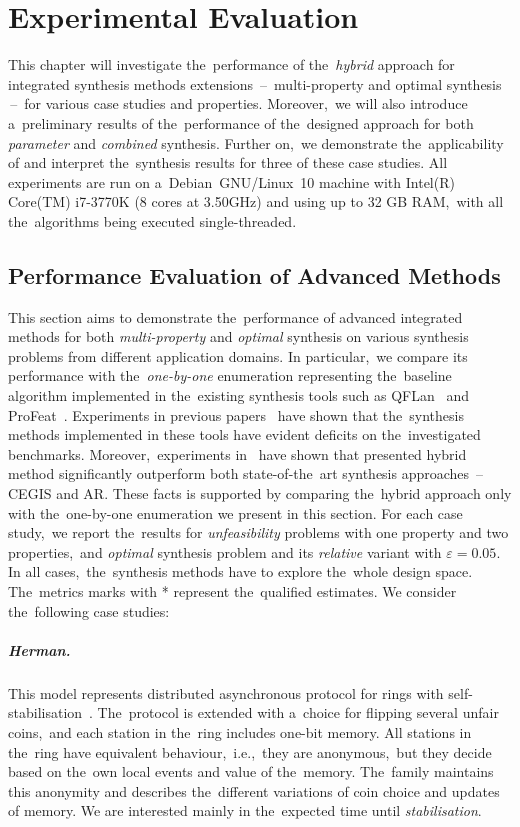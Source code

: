 \chapter{Experimental Evaluation}\label{chap:experiments}
This chapter will investigate the~performance of the~\emph{hybrid} approach for integrated synthesis methods extensions \,--\, multi-property and optimal synthesis \,--\, for various case studies and properties.
Moreover,~we will also introduce a~preliminary results of the~performance of the~designed approach for both \emph{parameter} and \emph{combined} synthesis.
Further on,~we demonstrate the~applicability of \toolname{} and interpret the~synthesis results for three of these case studies.
All experiments are run on a~Debian~GNU/Linux~10 machine with Intel(R) Core(TM) i7-3770K (8 cores at 3.50GHz) and using up to 32 GB RAM,~with all the~algorithms being executed single-threaded.

\section{Performance Evaluation of Advanced Methods}
This section aims to demonstrate the~performance of advanced integrated methods for both \textit{multi-property} and \textit{optimal} synthesis on various synthesis problems from different application domains.
In particular,~we compare its performance with the~\emph{one-by-one} enumeration representing the~baseline algorithm implemented in the~existing synthesis tools such as QFLan~\cite{qflan} and ProFeat~\cite{profeat}.
Experiments in previous papers~\cite{cegar,cegis} have shown that the~synthesis methods implemented in these tools have evident deficits on the~investigated benchmarks.
Moreover,~experiments in~\cite{roman-DP} have shown that presented hybrid method significantly outperform both state-of-the~art synthesis approaches \,--\, CEGIS and AR.
These facts is supported by comparing the~hybrid approach only with the~one-by-one enumeration we present in this section.
For each case study,~we report the~results for \textit{unfeasibility} problems with one property and two properties,~and \textit{optimal} synthesis problem and its \textit{relative} variant with $\varepsilon = 0.05$.
In all cases,~the~synthesis methods have to explore the~whole design space.
The~metrics marks with * represent the~qualified estimates.
We consider the~following case studies:

\paragraph{Herman.}
This model represents distributed asynchronous protocol for rings with self-stabilisation~\cite{herman1,herman2}.
The~protocol is extended with a~choice for flipping several unfair coins,~and each station in the~ring includes one-bit memory.
All stations in the~ring have equivalent behaviour,~i.e.,~they are anonymous,~but they decide based on the~own local events and value of the~memory.
The~family maintains this anonymity and describes the~different variations of coin choice and updates of memory.
We are interested mainly in the~expected time until \emph{stabilisation}.
    
